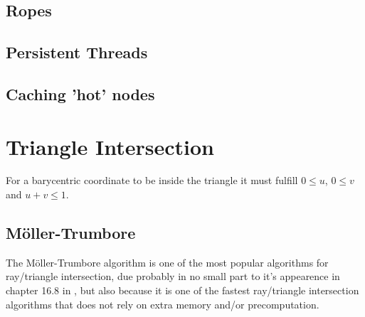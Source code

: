 \subsection{Ropes}


\subsection{Persistent Threads}


\subsection{Caching 'hot' nodes}





\section{Triangle Intersection}



For a barycentric coordinate to be inside the triangle it must fulfill
$0 \le u$, $0 \le v$ and $u+v \le 1$.

\subsection{Möller-Trumbore}


The Möller-Trumbore algorithm is one of the most popular algorithms
for ray/triangle intersection, due probably in no small part to it's
appearence in chapter 16.8 in , but also because it is
one of the fastest ray/triangle intersection algorithms that does not
rely on extra memory and/or precomputation.

